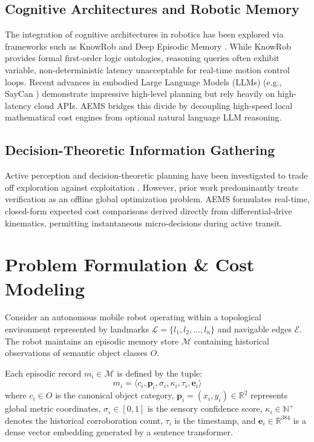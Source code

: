 \documentclass[conference]{IEEEtran}
\begin{document}
\subsection{Cognitive Architectures and Robotic Memory}
The integration of cognitive architectures in robotics has been explored via frameworks such as KnowRob \cite{tenorth2009knowrob} and Deep Episodic Memory \cite{blundell2016model}. While KnowRob provides formal first-order logic ontologies, reasoning queries often exhibit variable, non-deterministic latency unacceptable for real-time motion control loops. Recent advances in embodied Large Language Models (LLMs) (e.g., SayCan \cite{ahn2022can}) demonstrate impressive high-level planning but rely heavily on high-latency cloud APIs. AEMS bridges this divide by decoupling high-speed local mathematical cost engines from optional natural language LLM reasoning.

\subsection{Decision-Theoretic Information Gathering}
Active perception and decision-theoretic planning have been investigated to trade off exploration against exploitation \cite{rosman2014decision, kollar2008trajectory}. However, prior work predominantly treats verification as an offline global optimization problem. AEMS formulates real-time, closed-form expected cost comparisons derived directly from differential-drive kinematics, permitting instantaneous micro-decisions during active transit.

\section{Problem Formulation \& Cost Modeling}

Consider an autonomous mobile robot operating within a topological environment represented by landmarks $\mathcal{L} = \{l_1, l_2, \dots, l_n\}$ and navigable edges $\mathcal{E}$. The robot maintains an episodic memory store $\mathcal{M}$ containing historical observations of semantic object classes $O$.

Each episodic record $m_i \in \mathcal{M}$ is defined by the tuple:
\begin{equation}
m_i = \langle c_i, \mathbf{p}_i, \sigma_i, \kappa_i, \tau_i, \mathbf{e}_i \rangle
\end{equation}
where $c_i \in O$ is the canonical object category, $\mathbf{p}_i = (x_i, y_i) \in \mathbb{R}^2$ represents global metric coordinates, $\sigma_i \in [0, 1]$ is the sensory confidence score, $\kappa_i \in \mathbb{N}^+$ denotes the historical corroboration count, $\tau_i$ is the timestamp, and $\mathbf{e}_i \in \mathbb{R}^{384}$ is a dense vector embedding generated by a sentence transformer.
\end{document}
